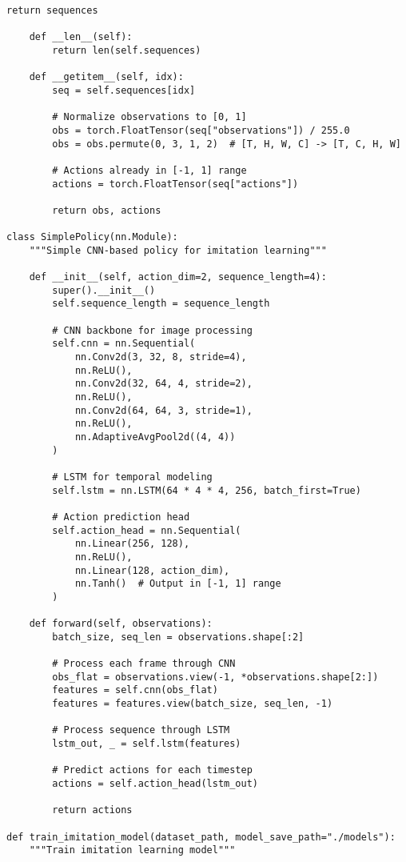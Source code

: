 \documentclass[11pt,a4paper]{article}
\begin{document}
\begin{lstlisting}[style=pythonstyle, caption={Imitation learning with LeRobot (train\_imitation.py)}]
        return sequences
    
    def __len__(self):
        return len(self.sequences)
    
    def __getitem__(self, idx):
        seq = self.sequences[idx]
        
        # Normalize observations to [0, 1]
        obs = torch.FloatTensor(seq["observations"]) / 255.0
        obs = obs.permute(0, 3, 1, 2)  # [T, H, W, C] -> [T, C, H, W]
        
        # Actions already in [-1, 1] range
        actions = torch.FloatTensor(seq["actions"])
        
        return obs, actions

class SimplePolicy(nn.Module):
    """Simple CNN-based policy for imitation learning"""
    
    def __init__(self, action_dim=2, sequence_length=4):
        super().__init__()
        self.sequence_length = sequence_length
        
        # CNN backbone for image processing
        self.cnn = nn.Sequential(
            nn.Conv2d(3, 32, 8, stride=4),
            nn.ReLU(),
            nn.Conv2d(32, 64, 4, stride=2),
            nn.ReLU(), 
            nn.Conv2d(64, 64, 3, stride=1),
            nn.ReLU(),
            nn.AdaptiveAvgPool2d((4, 4))
        )
        
        # LSTM for temporal modeling
        self.lstm = nn.LSTM(64 * 4 * 4, 256, batch_first=True)
        
        # Action prediction head
        self.action_head = nn.Sequential(
            nn.Linear(256, 128),
            nn.ReLU(),
            nn.Linear(128, action_dim),
            nn.Tanh()  # Output in [-1, 1] range
        )
    
    def forward(self, observations):
        batch_size, seq_len = observations.shape[:2]
        
        # Process each frame through CNN
        obs_flat = observations.view(-1, *observations.shape[2:])
        features = self.cnn(obs_flat)
        features = features.view(batch_size, seq_len, -1)
        
        # Process sequence through LSTM
        lstm_out, _ = self.lstm(features)
        
        # Predict actions for each timestep
        actions = self.action_head(lstm_out)
        
        return actions

def train_imitation_model(dataset_path, model_save_path="./models"):
    """Train imitation learning model"""
    

\end{lstlisting}
\end{document}
